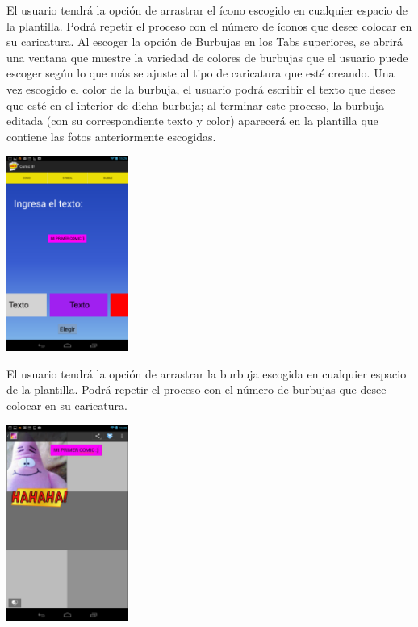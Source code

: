 \documentclass[12pt]{report}
\begin{document}

El usuario tendrá la opción de arrastrar el ícono escogido en cualquier espacio de la plantilla. Podrá repetir el proceso con el número de íconos que desee colocar en su caricatura.
Al escoger la opción de Burbujas en los Tabs superiores, se abrirá una ventana que muestre la variedad de colores de burbujas que el usuario puede escoger según lo que más se ajuste al tipo de caricatura que esté creando. Una vez escogido el color de la burbuja, el usuario podrá escribir el texto que desee que esté en el interior de dicha burbuja; al terminar este proceso, la burbuja editada (con su correspondiente texto y color) aparecerá en la plantilla que contiene las fotos anteriormente escogidas.

	\begin{center}
		\begingroup
			\includegraphics[width=0.30\textwidth]{imagenes_usuario/texto.png}
		\endgroup
	\end{center}



El usuario tendrá la opción de arrastrar la burbuja escogida en cualquier espacio de la plantilla. Podrá repetir el proceso con el número de burbujas que desee colocar en su caricatura.


	\begin{center}
		\begingroup
			\includegraphics[width=0.30\textwidth]{imagenes_usuario/comic.png}
		\endgroup
	\end{center}
\end{document}
